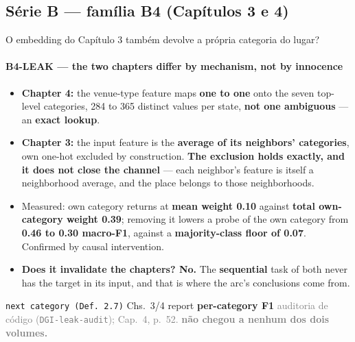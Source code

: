\documentclass{beamer}
\begin{document}
\subsection{Série B --- família B4 (Capítulos 3 e 4)}

\begin{frame}[noframenumbering]{O embedding do Capítulo 3 também devolve a própria categoria do lugar?}
    \framesubtitle{B4-LEAK --- the two chapters differ by mechanism, not by innocence}
    \hypertarget{b4leak}{}
    \small\begin{itemize}\setlength{\itemsep}{0pt}\setlength{\parskip}{0pt}
        \item \textbf{Chapter 4:} the venue-type feature maps \textbf{one to one} onto the seven top-level categories, 284 to 365 distinct values per state, \textbf{not one ambiguous} --- an \textbf{exact lookup}.
        \item \textbf{Chapter 3:} the input feature is the \textbf{average of its neighbors' categories}, own one-hot excluded by construction. \textbf{The exclusion holds exactly, and it does not close the channel} --- each neighbor's feature is itself a neighborhood average, and the place belongs to those neighborhoods.
        \item Measured: own category returns at \textbf{mean weight 0.10} against \textbf{total own-category weight 0.39}; removing it lowers a probe of the own category from \textbf{0.46 to 0.30 macro-F1}, against a \textbf{majority-class floor of 0.07}. Confirmed by causal intervention.
        \item \textcolor{alert}{\textbf{Does it invalidate the chapters? No.}} The \textbf{sequential} task of both never has the target in its input, and that is where the arc's conclusions come from.
    \end{itemize}
    \vfill
    {\scriptsize\texttt{next category (Def.~2.7)} \textbullet{} Chs.~3/4 report \textbf{per-category F1} \textbullet{} \textcolor{gray}{auditoria de código (\texttt{DGI-leak-audit}); Cap.~4, p.~52. \textbf{não chegou a nenhum dos dois volumes.}}\hfill\hyperlink{b0}{}}
\end{frame}
\end{document}
